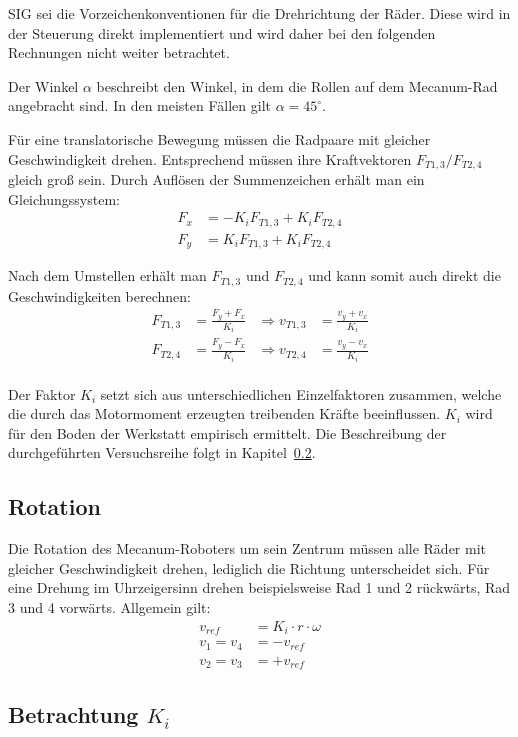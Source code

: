 SIG sei die Vorzeichenkonventionen für die Drehrichtung der Räder.
Diese wird in der Steuerung direkt implementiert und wird daher bei den folgenden Rechnungen nicht weiter betrachtet.

Der Winkel $ \alpha $ beschreibt den Winkel, in dem die Rollen auf dem Mecanum-Rad angebracht sind.
In den meisten Fällen gilt $\alpha = 45^\circ$.

Für eine translatorische Bewegung müssen die Radpaare mit gleicher Geschwindigkeit drehen.
Entsprechend müssen ihre Kraftvektoren $F_{T1, 3} / F_{T2, 4}$ gleich groß sein.
Durch Auflösen der Summenzeichen erhält man ein Gleichungssystem:
\begin{align*}
    F_x &= - K_i F_{T1, 3} + K_i F_{T2, 4} \\
    F_y &= K_i F_{T1, 3}   + K_i F_{T2, 4}
\end{align*}

Nach dem Umstellen erhält man $F_{T1, 3}$ und $F_{T2, 4}$ und kann somit auch direkt die Geschwindigkeiten berechnen:
\begin{align*}
    F_{T1, 3} &= \frac{F_y + F_x}{K_i} &\Rightarrow v_{T1, 3} &= \frac{v_y + v_x}{K_i} \\
    F_{T2, 4} &= \frac{F_y - F_x}{K_i} &\Rightarrow v_{T2, 4} &= \frac{v_y - v_x}{K_i} \\
\end{align*}

Der Faktor $K_i$ setzt sich aus unterschiedlichen Einzelfaktoren zusammen, welche die durch das Motormoment erzeugten treibenden Kräfte beeinflussen. $K_i$ wird für den Boden der Werkstatt empirisch ermittelt. Die Beschreibung der durchgeführten Versuchsreihe folgt in Kapitel~\ref{sec:k-faktor}.


\subsection{Rotation}
\label{sec:Rotation}
Die Rotation des Mecanum-Roboters um sein Zentrum müssen alle Räder mit gleicher Geschwindigkeit drehen, lediglich die Richtung unterscheidet sich.
Für eine Drehung im Uhrzeigersinn drehen beispielsweise Rad 1 und 2 rückwärts, Rad 3 und 4 vorwärts. Allgemein gilt:
\begin{align*}
    v_{ref} &= K_i \cdot r \cdot \omega \\
    v_1 = v_4 &= - v_{ref} \\
    v_2 = v_3 &= + v_{ref}
\end{align*}

\subsection{Betrachtung $K_i$}
\label{sec:k-faktor}

